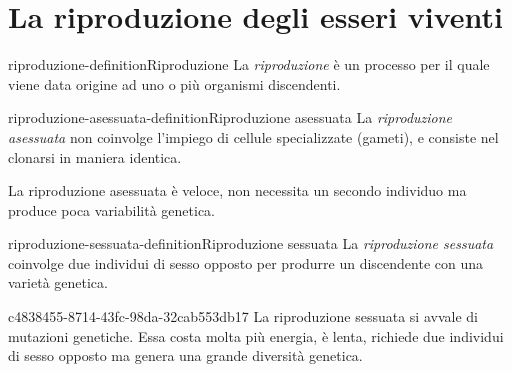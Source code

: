 \documentclass[preview]{standalone}
\begin{document}
\genpage

\section{La riproduzione degli esseri viventi}

\begin{snippetdefinition}{riproduzione-definition}{Riproduzione}
    La \textit{riproduzione} è un processo per il quale viene data origine ad uno o più organismi
    discendenti.
\end{snippetdefinition}

\begin{snippetdefinition}{riproduzione-asessuata-definition}{Riproduzione asessuata}
    La \textit{riproduzione asessuata} non coinvolge l'impiego di cellule specializzate (gameti),
    e consiste nel clonarsi in maniera identica.
\end{snippetdefinition}

\begin{plainhtml}
    La riproduzione asessuata è veloce, non necessita un secondo individuo ma
    produce poca variabilità genetica.
\end{plainhtml}

\begin{snippetdefinition}{riproduzione-sessuata-definition}{Riproduzione sessuata}
    La \textit{riproduzione sessuata} coinvolge due individui di sesso opposto per produrre un discendente
    con una varietà genetica.
\end{snippetdefinition}

\begin{snippet}{c4838455-8714-43fc-98da-32cab553db17}
    La riproduzione sessuata si avvale di mutazioni genetiche.
    Essa costa molta più energia, è lenta, richiede due individui di sesso opposto ma
    genera una grande diversità genetica.
\end{snippet}
\end{document}
